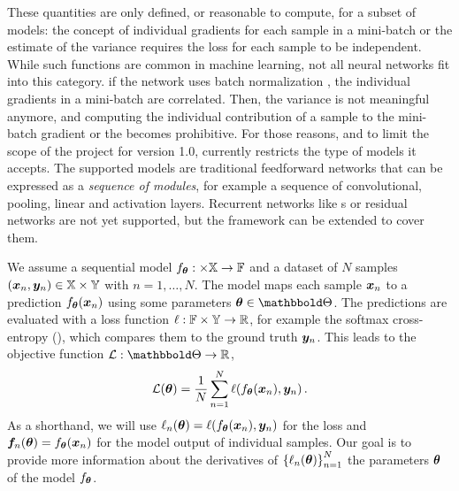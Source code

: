 These quantities are only defined, or reasonable to compute, for a subset of
models: the concept of individual gradients for each sample in a mini-batch or
the estimate of the variance requires the loss for each sample to be
independent. While such functions are common in machine learning, not all neural
networks fit into this category. \Eg if the network uses batch normalization
\citep{ioffe2015batch}, the individual gradients in a mini-batch are correlated.
Then, the variance is not meaningful anymore, and computing the individual
contribution of a sample to the mini-batch gradient or the \GGN%
becomes prohibitive. For those reasons, and to limit the scope of the project
for version 1.0, \BackPACK%
currently restricts the type of models it accepts. The supported models are
traditional feedforward networks that can be expressed as a \emph{sequence of
  modules}, for example a sequence of convolutional, pooling, linear and
activation layers. Recurrent networks like \LSTM%
\!\!s \citep{hochreither1997lstm} or residual networks \citep{he2016deep} are
not yet supported, but the framework can be extended to cover them.

We assume a sequential model $f_{{\bm{\theta}}}: \times {\mathbb{X}} \rightarrow {\mathbb{F}}$
and a dataset of $N$ samples $({\bm{x}}_n, {\bm{y}}_n) \in {\mathbb{X}} \times {\mathbb{Y}}$ with
$n=1,\dots, N$. The model maps each sample ${\bm{x}}_n$ to a prediction
$f_{{\bm{\theta}}}({\bm{x}}_n)$ using some parameters $\vtheta \in \sTheta$. The
predictions are evaluated with a loss function $\ell : {\mathbb{F}} \times {\mathbb{Y}}
\rightarrow \mathbb{R}$, for example the softmax cross-entropy
(), which compares them to the ground
truth ${\bm{y}}_n$. This leads to the objective function $\mathcal{L}: \sTheta
\rightarrow \R$,
\begin{equation}
  \label{backpack::eq:objective}
  \mathcal{L}({\bm{\theta}})
  =
  \frac{1}{N} \sum_{n=1}^N \ell(f_{{\bm{\theta}}}({\bm{x}}_n), {\bm{y}}_n)\,{.}
\end{equation}
As a shorthand, we will use $\ell_n({\bm{\theta}}) = \ell(f_{{\bm{\theta}}}({\bm{x}}_n), {\bm{y}}_n)$
for the loss and ${\bm{f}}_n({\bm{\theta}}) = f_{{\bm{\theta}}}({\bm{x}}_n)$ for the model output of
individual samples. Our goal is to provide more information about the
derivatives of ${\{\ell_n({\bm{\theta}})\}}_{n=1}^{N}$ \wrt the parameters
${\bm{\theta}}$ of the model $f_{{\bm{\theta}}}$.

